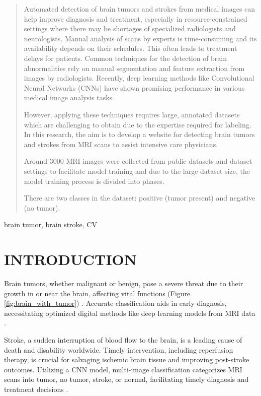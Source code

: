 \documentclass[conference]{IEEEtran}
\begin{document}
\begin{abstract}

Automated detection of brain tumors and strokes from medical images can help improve diagnosis and treatment, especially in resource-constrained settings where there may be shortages of specialized radiologists and neurologists.
Manual analysis of scans by experts is time-consuming and its availability depends on their schedules. This often leads to treatment delays for patients. 
Common techniques for the detection of brain abnormalities rely on manual segmentation and feature extraction from images by radiologists. Recently, deep learning methods like Convolutional Neural Networks (CNNs) have shown promising performance in various medical image analysis tasks.

However, applying these techniques requires large, annotated datasets which are challenging to obtain due to the expertise required for labeling. In this research, the aim is to develop a website for detecting brain tumors and strokes from MRI scans to assist intensive care physicians.

Around 3000 MRI images were collected from public datasets and dataset settings to facilitate model training and due to the large dataset size, the model training process is divided into phases. 

There are two classes in the dataset: positive (tumor present) and negative (no tumor).

\end{abstract}

\begin{IEEEkeywords}
brain tumor, brain stroke, CV
\end{IEEEkeywords}


\section{INTRODUCTION}

Brain tumors, whether malignant or benign, pose a severe threat due to their growth in or near the brain, affecting vital functions (Figure \ref{fig:brain_with_tumor}) \cite{br35h}. Accurate classification aids in early diagnosis, necessitating optimized digital methods like deep learning models from MRI data \cite{bioengineering9120783}.

Stroke, a sudden interruption of blood flow to the brain, is a leading cause of death and disability worldwide. Timely intervention, including reperfusion therapy, is crucial for salvaging ischemic brain tissue and improving post-stroke outcomes. Utilizing a CNN model, multi-image classification categorizes MRI scans into tumor, no tumor, stroke, or normal, facilitating timely diagnosis and treatment decisions \cite{huggingface_data, ding2021repvgg}.
\end{document}
